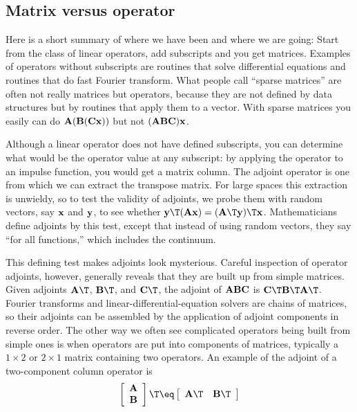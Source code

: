 \subsection{Matrix versus operator}
Here is a short summary of where we have been and where we are going:
Start from the class of linear operators, add subscripts
and you get matrices.  Examples of operators without subscripts
are routines that solve differential equations and
routines that do fast Fourier transform.
What people call ``sparse matrices'' are often not really matrices
but operators,
because they are not defined by data structures
but by routines that apply them to a vector.
With sparse matrices you easily can do
$\bold A(\bold B(\bold C\bold x))$
but not
$(\bold A\bold B\bold C)\bold x$.
\par
Although a linear operator does not have defined subscripts,
you can determine what would be the operator value at any subscript:
by applying the operator to an impulse function, you would get a matrix column.
The adjoint operator is one from which we can extract the transpose matrix.
For large spaces this extraction is unwieldy,
so to test the validity of adjoints,
we probe them with random vectors,
say $\bold x$ and $\bold y$,
to see whether
$\bold y\T(\bold A\bold x)=(\bold A\T\bold y)\T \bold x$.
Mathematicians define adjoints by this test,
except that instead of using random vectors,
they say ``for all functions,'' which includes the continuum.
\par
This defining test makes adjoints look mysterious.
Careful inspection of operator adjoints,
however, generally reveals that they are built up from simple matrices.
Given adjoints
$\bold A\T$,
$\bold B\T$,
and
$\bold C\T$,
the adjoint of
$\bold A\bold B\bold C$
is
$\bold C\T\bold B\T\bold A\T$.
Fourier transforms and linear-differential-equation solvers
are chains of matrices,
so their adjoints can be assembled
by the application of adjoint components in reverse order.
The other way we often see complicated operators being built from simple ones
is when operators are put into components of matrices,
typically a
$1\times 2$
or
$2\times 1$
matrix containing two operators.
An example of the adjoint of a two-component column operator is
\begin{equation}
 \left[
  \begin{array}{c}
   \bold A \\
   \bold B
  \end{array}
 \right]\T
\eq
 \left[
  \begin{array}{cc}
   \bold A\T & \bold B\T
  \end{array}
 \right]
\end{equation}
